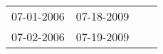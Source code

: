 \begin{supertabular}{llll}
 07-01-2006 &  07-18-2009 \\
 07-02-2006 &  07-19-2009 \\
\end{supertabular}
